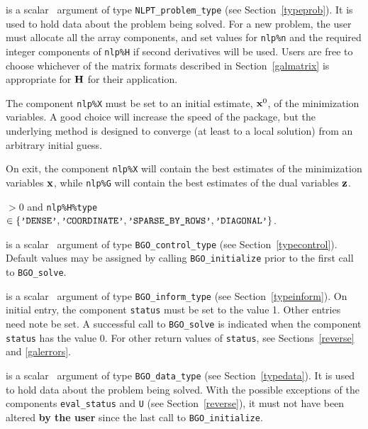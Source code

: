 \documentclass{galahad}
\newcommand{\packagename}{BGO}
\begin{document}
\vspace*{-2mm}
\begin{description}
 is a scalar \intentinout\ argument of type
{\tt NLPT\_problem\_type}
(see Section~\ref{typeprob}).
It is used to hold data about the problem being solved.
For a new problem, the user must allocate all the array components,
and set values for {\tt nlp\%n}
and the required integer components of {\tt nlp\%H} if second derivatives
will be used.
Users are free to choose whichever
of the matrix formats described in Section~\ref{galmatrix}
is appropriate for ${\mathbf{H}}$ for their application.

\noindent
The component {\tt nlp\%X} must be set to an initial estimate, ${\mathbf{x}}^{0}$,
of the minimization variables. A good choice will increase the speed
of the package, but the underlying method is designed to converge (at least
to a local solution) from an arbitrary initial guess.

\noindent
On exit, the component {\tt nlp\%X} will contain the best estimates of the
minimization variables ${\mathbf{x}}$, while {\tt nlp\%G} will contain the best
estimates of the dual variables ${\mathbf{z}}$.

\noindent
{} $> 0$ and
{\tt nlp\%H\%type} $\in \{
  \mbox{\tt 'DENSE'}, \mbox{\tt 'COORDINATE'}, \mbox{\tt 'SPARSE\_BY\_ROWS'},
  \mbox{\tt 'DIAGONAL'} \}$.

 is a scalar \intentin\ argument of type
{\tt \packagename\_control\_type}
(see Section~\ref{typecontrol}). Default values may be assigned by calling
{\tt \packagename\_initialize} prior to the first call to
{\tt \packagename\_solve}.

 is a scalar \intentinout\ argument of type
{\tt \packagename\_inform\_type}
(see Section~\ref{typeinform}).
On initial entry, the  component {\tt status} must be set to the value 1.
Other entries need note be set.
A successful call to
{\tt \packagename\_solve}
is indicated when the  component {\tt status} has the value 0.
For other return values of {\tt status}, see Sections~\ref{reverse} and
\ref{galerrors}.

 is a scalar \intentinout\ argument of type
{\tt \packagename\_data\_type}
(see Section~\ref{typedata}). It is used to hold data about the problem being
solved. With the possible exceptions of the components
{\tt eval\_status} and {\tt U} (see Section~\ref{reverse}),
it must not have been altered {\bf by the user} since the last call to
{\tt \packagename\_initialize}.


\end{description}
\end{document}
